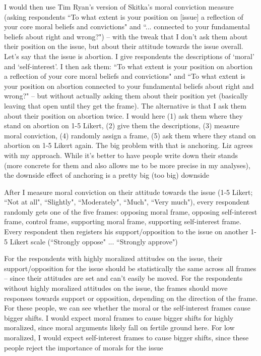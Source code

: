 \documentclass[12pt]{article}
\begin{document}
\begin{coi}
\begin{coi}
				\item I would then use Tim Ryan's version of Skitka's moral conviction measure (asking respondents ``To what extent is your position on [issue] a reflection of your core moral beliefs and convictions" and ``... connected to your fundamental beliefs about right and wrong?") -- with the tweak that I don't ask them about their position on the issue, but about their attitude towards the issue overall. Let's say that the issue is abortion. I give respondents the descriptions of `moral' and `self-interest'. I then ask them: ``To what extent is your position on abortion a reflection of your core moral beliefs and convictions" and ``To what extent is your position on abortion connected to your fundamental beliefs about right and wrong?" -- but without actually asking them about their position yet (basically leaving that open until they get the frame). The alternative is that I ask them about their position on abortion twice. I would here (1) ask them where they stand on abortion on 1-5 Likert, (2) give them the descriptions, (3) measure moral conviction, (4) randomly assign a frame, (5) ask them where they stand on abortion on 1-5 Likert again. The big problem with that is anchoring. Liz agrees with my approach. While it's better to have people write down their stands (more concrete for them and also allows me to be more precise in my analyses), the downside effect of anchoring is a pretty big (too big) downside
				\item After I measure moral conviction on their attitude towards the issue (1-5 Likert; ``Not at all", ``Slightly", ``Moderately", ``Much", ``Very much"), every respondent randomly gets one of the five frames: opposing moral frame, opposing self-interest frame, control frame, supporting moral frame, supporting self-interest frame. Every respondent then registers his support/opposition to the issue on another 1-5 Likert scale (``Strongly oppose" ... ``Strongly approve")
				\item For the respondents with highly moralized attitudes on the issue, their support/opposition for the issue should be statistically the same across all frames -- since their attitudes are set and can't easily be moved. For the respondents without highly moralized attitudes on the issue, the frames should move responses towards support or opposition, depending on the direction of the frame. For these people, we can see whether the moral or the self-interest frames cause bigger shifts. I would expect moral frames to cause bigger shifts for highly moralized, since moral arguments likely fall on fertile ground here. For low moralized, I would expect self-interest frames to cause bigger shifts, since these people reject the importance of morals for the issue

\end{coi}
\end{coi}
\end{document}
